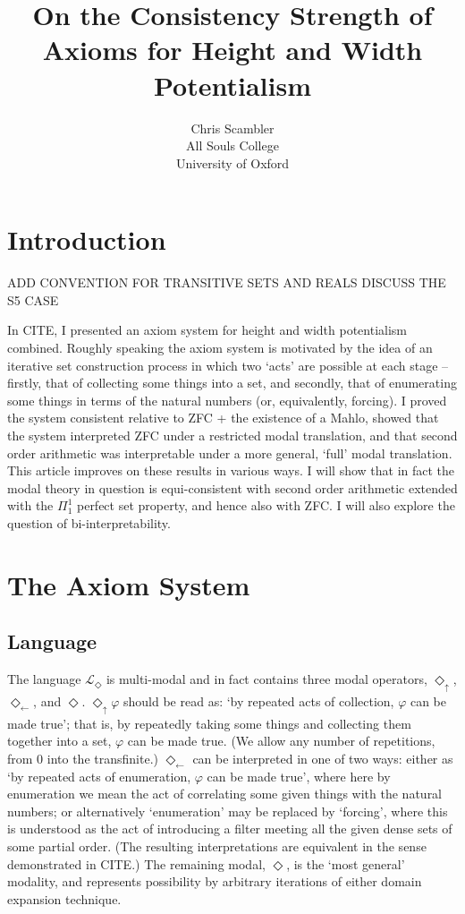 \documentclass{article}
\title{On the Consistency Strength of Axioms for Height and Width Potentialism}
\author{Chris Scambler 
\\
All Souls College\\
University of Oxford}
\theoremstyle{definition}
\newcommand{\du}{\Diamond_\uparrow}
\newcommand{\dl}{\Diamond_\leftarrow}
\begin{document}
 
\maketitle

\section{Introduction}
ADD CONVENTION FOR TRANSITIVE SETS AND REALS 
DISCUSS THE S5 CASE

In CITE, I presented an axiom system for height and width potentialism combined. 
Roughly speaking the axiom system is motivated by the idea of an iterative set 
construction process in which two `acts' are possible at each stage -- 
firstly, that of collecting some things 
into a set, and secondly, that of enumerating some things in terms of the natural 
numbers (or, equivalently, forcing). I proved the system consistent relative 
to ZFC + the existence of a Mahlo, showed that the system interpreted ZFC under a restricted
modal translation, and that second order arithmetic was interpretable under a 
more general, `full' modal translation. This article improves on these results in various ways.
I will show that in fact the modal theory in question is equi-consistent with second order 
arithmetic extended with the $\Pi_1^1$ perfect set property, and hence also with ZFC.
I will also explore the question of bi-interpretability.

\section{The Axiom System}
\subsection{Language}
The language $\mathcal{L}_\Diamond$ is multi-modal and in fact contains three modal 
operators, $\du$, $\dl$, and $\Diamond$. $\du \varphi$ should be read as: `by repeated 
acts of collection, $\varphi$ can be made true'; that is, by repeatedly taking some things 
and collecting them together into a set, $\varphi$ can be made true. 
(We allow any number of repetitions, from $0$ into the transfinite.) 
$\dl$ can be interpreted in one of two ways: either as `by repeated acts of enumeration, 
$\varphi$ can be made true', where here by enumeration we mean the act of correlating 
some given things with the natural numbers; or alternatively `enumeration' 
may be replaced by `forcing', where this is understood as the act of 
introducing a filter meeting all the given dense sets of some partial order.
(The resulting interpretations are equivalent in the sense demonstrated in 
CITE.) The remaining modal, $\Diamond$, is the `most general' modality, 
and represents possibility by arbitrary iterations of either domain expansion technique. 
\end{document}
